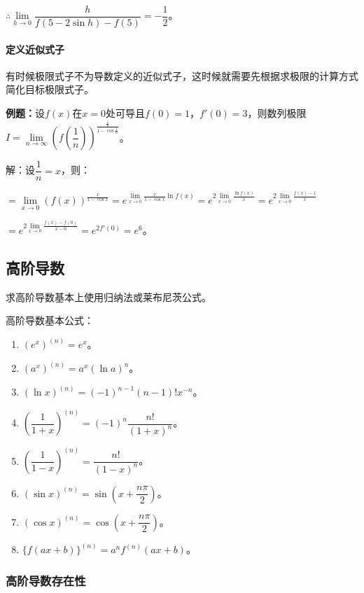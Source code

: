 \documentclass[UTF8, 12pt]{ctexart}
\begin{document}
$\therefore\lim\limits_{h\to 0}\dfrac{h}{f(5-2\sin h)-f(5)}=-\dfrac{1}{2}$。

\paragraph{定义近似式子} \leavevmode \medskip

有时候极限式子不为导数定义的近似式子，这时候就需要先根据求极限的计算方式简化目标极限式子。

\textbf{例题：}设$f(x)$在$x=0$处可导且$f(0)=1$，$f'(0)=3$，则数列极限$I=\lim\limits_{n\to\infty}\left(f\left(\dfrac{1}{n}\right)\right)^{\frac{\frac{1}{n}}{1-\cos\frac{1}{n}}}$。\medskip

解：设$\dfrac{1}{n}=x$，则：

$=\lim\limits_{x\to 0}(f(x))^{\frac{x}{1-\cos x}}=e^{\lim\limits_{x\to 0}\frac{x}{1-\cos x}\ln f(x)}=e^{2\lim\limits_{x\to 0}\frac{\ln f(x)}{x}}=e^{2\lim\limits_{x\to 0}\frac{f(x)-1}{x}}$

$=e^{2\lim\limits_{x\to 0}\frac{f(x)-f(0)}{x-0}}=e^{2f'(0)}=e^6$。

\subsection{高阶导数}

求高阶导数基本上使用归纳法或莱布尼茨公式。

高阶导数基本公式：

\begin{enumerate}
    \item $(e^x)^{(n)}=e^x$。
    \item $(a^x)^{(n)}=a^x(\ln a)^n$。
    \item $(\ln x)^{(n)}=(-1)^{n-1}(n-1)!x^{-n}$。
    \item $\left(\dfrac{1}{1+x}\right)^{(n)}=(-1)^n\dfrac{n!}{(1+x)^n}$。
    \item $\left(\dfrac{1}{1-x}\right)^{(n)}=\dfrac{n!}{(1-x)^n}$。
    \item $(\sin x)^{(n)}=\sin\left(x+\dfrac{n\pi}{2}\right)$。
    \item $(\cos x)^{(n)}=\cos\left(x+\dfrac{n\pi}{2}\right)$。
    \item $\{f(ax+b)\}^{(n)}=a^nf^{(n)}(ax+b)$。
\end{enumerate}

\subsubsection{高阶导数存在性}
\end{document}
